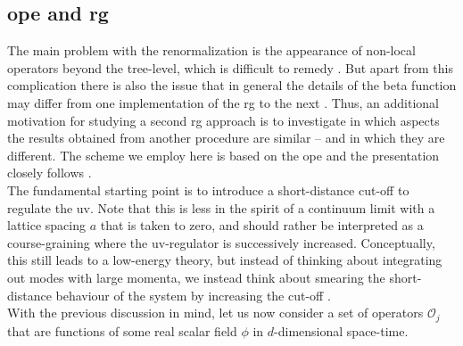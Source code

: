 \subsection{\texorpdfstring{\acrlong{ope}}{OPE} and \texorpdfstring{\acrshort{rg}}{RG}}\label{sec:rg:ope_and_rg}
The main problem with the \tms{} renormalization is the appearance of non-local operators beyond the tree-level, which is difficult to remedy \cite{RG_Wilson_SmoothCutoff_Nozieres_1987}.
But apart from this complication there is also the issue that in general the details of the beta function may differ from one implementation of the \gls{rg} to the next \cite[\sapp E]{Giamarchi_2004}.
Thus, an additional motivation for studying a second \gls{rg} approach is to investigate in which aspects the results obtained from another procedure are similar -- and in which they are different.
The scheme we employ here is based on the \gls{ope} and the presentation closely follows \cites[]{Cardy_1996}[]{Fradkin_2013}. \\ %
The fundamental starting point is to introduce a short-distance cut-off to regulate the \gls{uv}.
Note that this is less in the spirit of a continuum limit with a lattice spacing $a$ that is taken to zero, and should rather be interpreted as a course-graining where the \gls{uv}-regulator is successively increased.
Conceptually, this still leads to a low-energy theory, but instead of thinking about integrating out modes with large momenta, we instead think about smearing the short-distance behaviour of the system by increasing the cut-off \cite[]{Fradkin_2013}. \\ %
With the previous discussion in mind, let us now consider a set of operators $\mathcal{O}_j$ that are functions of some real scalar field $\phi$ in $d$-dimensional space-time.
